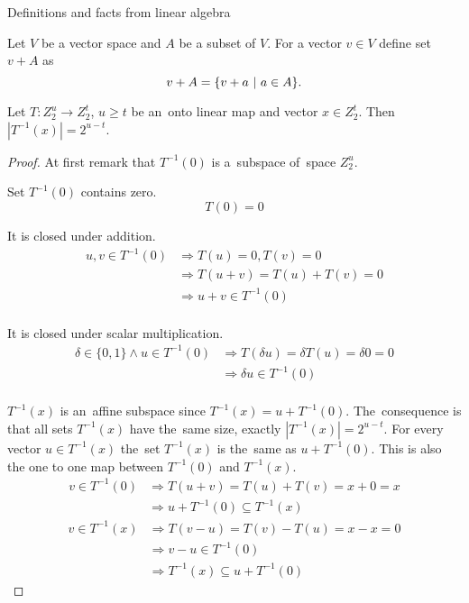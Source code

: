 \begin{section}{Definitions and facts from linear algebra}
\begin{definition}
Let $V$ be a vector space and $A$ be a subset of $V$. For a vector $v \in V$ define set $v + A$ as
\[ v + A = \{ v + a \ | \  a \in A \} \text{.} \] 
\end{definition}

\begin{lemma}
\label{lemma-linear-transformation-domain-distribution}
Let $T: Z_2^u \rightarrow Z_2^t$, $u \geq t$ be an~onto linear map and vector $x \in Z_2^t$. Then $|T^{-1}(x)| = 2 ^ {u-t}$.
\end{lemma}
\begin{proof}
At first remark that $T^{-1}(0)$ is a~subspace of~space $Z_2^u$.

Set $T^{-1}(0)$ contains zero.
\[ T(0) = 0 \]

It is closed under addition.
\[
\begin{split}
u, v \in T^{-1}(0) 
	& \Rightarrow T(u) = 0, T(v) = 0 \\ 
	& \Rightarrow T(u + v) = T(u) + T(v) = 0 \\ 
	& \Rightarrow u + v \in T^{-1}(0) \\
\end{split}
\]

It is closed under scalar multiplication.
\[
\begin{split}
\delta \in \{0, 1\} \wedge u \in T^{-1}(0) 
	& \Rightarrow T(\delta u) = \delta T(u) = \delta 0 = 0 \\
	& \Rightarrow \delta u \in T^{-1}(0) \\
\end{split}
\]

$T^{-1}(x)$ is an~affine subspace since $T^{-1}(x) = u + T^{-1}(0)$. The~consequence is that all sets $T^{-1}(x)$ have the~same size, exactly $|T^{-1}(x)| = 2^{u-t}$. For every vector $u \in T^{-1}(x)$ the~set $T^{-1}(x)$ is the~same as $u + T^{-1}(0)$. This is also the one to one map between $T^{-1}(0)$ and $T^{-1}(x)$.
\begin{displaymath}
\begin{split}
v \in T^{-1}(0) 
	& \Rightarrow T(u+v) = T(u) + T(v) = x + 0 = x  \\
	& \Rightarrow u + T^{-1}(0) \subseteq T^{-1}(x)
\end{split}
\end{displaymath}
\begin{displaymath}
\begin{split}
v \in T^{-1}(x) 
	& \Rightarrow T(v-u) = T(v) - T(u) = x - x = 0 \\
	& \Rightarrow v - u \in T^{-1}(0) \\
	& \Rightarrow T^{-1}(x) \subseteq u + T^{-1}(0)
\end{split}
\end{displaymath}
\end{proof}
\end{section}